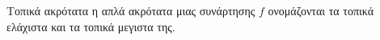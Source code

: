 Τοπικά ακρότατα η απλά ακρότατα μιας συνάρτησης $ f $ ονομάζονται τα τοπικά ελάχιστα και τα τοπικά μεγιστα της.
